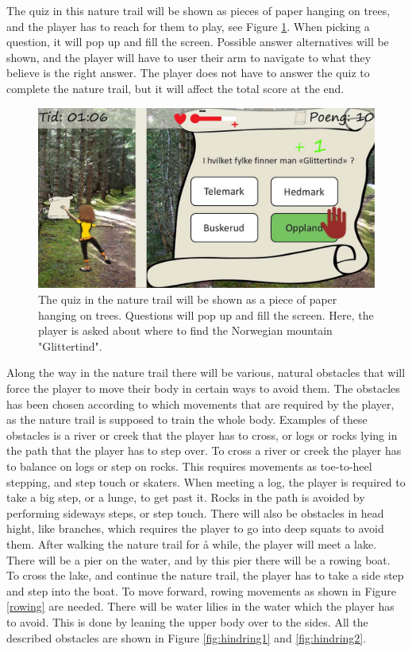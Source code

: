 The quiz in this nature trail will be shown as pieces of paper hanging on trees, and the player has to reach for them to play, see Figure \ref{fig:quiz}. When picking a question, it will pop up and fill the screen. Possible answer alternatives will be shown, and the player will have to user their arm to navigate to what they believe is the right answer. The player does not have to answer the quiz to complete the nature trail, but it will affect the total score at the end. 

\begin{figure} [H]
\centering
\includegraphics[scale=0.5]{quiz.jpg}
\caption[Nature trail - quiz]{The quiz in the nature trail will be shown as a piece of paper hanging on trees. Questions will pop up and fill the screen. Here, the player is asked about where to find the Norwegian mountain "Glittertind".}
\label{fig:quiz}
\end{figure} 

Along the way in the nature trail there will be various, natural obstacles that will force the player to move their body in certain ways to avoid them. The obstacles has been chosen according to which movements that are required by the player, as the nature trail is supposed to train the whole body. Examples of these obstacles is a river or creek that the player has to cross, or logs or rocks lying in the path that the player has to step over. To cross a river or creek the player has to balance on logs or step on rocks. This requires movements as toe-to-heel stepping, and step touch or skaters. When meeting a log, the player is required to take a big step, or a lunge, to get past it. Rocks in the path is avoided by performing sideways steps, or step touch. There will also be obstacles in head hight, like branches, which requires the player to go into deep squats to avoid them. After walking the nature trail for å while, the player will meet a lake. There will be a pier on the water, and by this pier there will be a rowing boat. To cross the lake, and continue the nature trail, the player has to take a side step and step into the boat. To move forward, rowing movements as shown in Figure \ref{rowing} are needed. There will be water lilies in the water which the player has to avoid. This is done by leaning the upper body over to the sides. All the described obstacles are shown in Figure \ref{fig:hindring1} and \ref{fig:hindring2}.     

